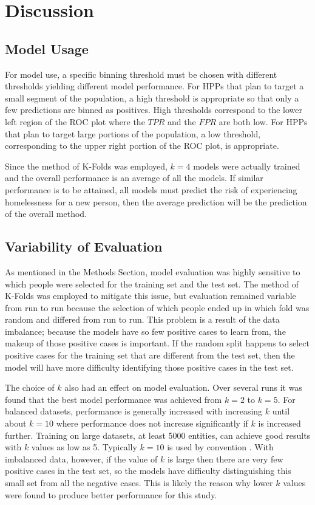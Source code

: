 \documentclass[utf8]{frontiersFPHY} %
\begin{document}
\section{Discussion}
\subsection{Model Usage}
For model use, a specific binning threshold must be chosen with different thresholds yielding different model performance. For HPPs that plan to target a small segment of the population, a high threshold is appropriate so that only a few predictions are binned as positives. High thresholds correspond to the lower left region of the ROC plot where the $TPR$ and the $FPR$ are both low. For HPPs that plan to target large portions of the population, a low threshold, corresponding to the upper right portion of the ROC plot, is appropriate. 

Since the method of K-Folds was employed, $k=4$ models were actually trained and the overall performance is an average of all the models. If similar performance is to be attained, all models must predict the risk of experiencing homelessness for a new person, then the average prediction will be the prediction of the overall method.

\subsection{Variability of Evaluation}
As mentioned in the Methods Section, model evaluation was highly sensitive to which people were selected for the training set and the test set. The method of K-Folds was employed to mitigate this issue, but evaluation remained variable from run to run because the selection of which people ended up in which fold was random and differed from run to run. This problem is a result of the data imbalance; because the models have so few positive cases to learn from, the makeup of those positive cases is important. If the random split happens to select positive cases for the training set that are different from the test set, then the model will have more difficulty identifying those positive cases in the test set. 

The choice of $k$ also had an effect on model evaluation. Over several runs it was found that the best model performance was achieved from $k=2$ to $k=5$. For balanced datasets, performance is generally increased with increasing $k$ until about $k=10$ where performance does not increase significantly if $k$ is increased further. Training on large datasets, at least 5000 entities, can achieve good results with $k$ values as low as 5. Typically $k=10$ is used by convention \cite{marcot2020optimal}. With imbalanced data, however, if the value of $k$ is large then there are very few positive cases in the test set, so the models have difficulty distinguishing this small set from all the negative cases. This is likely the reason why lower $k$ values were found to produce better performance for this study.
\end{document}
